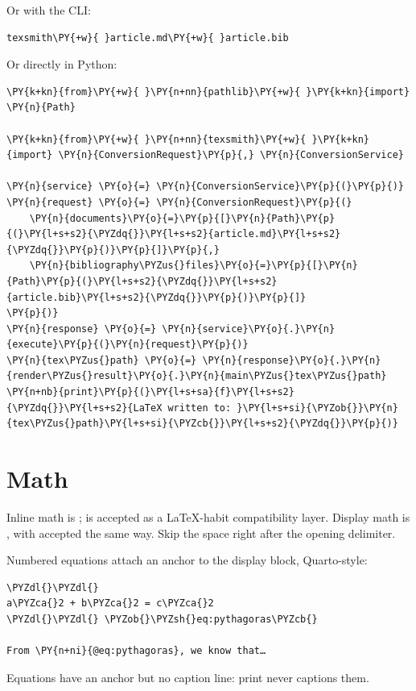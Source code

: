 \documentclass[a4paper,twoside]{article}
\begin{document}
Or with the CLI:
\begin{tscode}[lang=sh, engine=pygments]
\begin{Verbatim}[commandchars=\\\{\},breaklines, breakanywhere, commandchars=\\\{\}]
texsmith\PY{+w}{ }article.md\PY{+w}{ }article.bib
\end{Verbatim}
\end{tscode}
Or directly in Python:
\begin{tscode}[lang=python, engine=pygments]
\begin{Verbatim}[commandchars=\\\{\},breaklines, breakanywhere, commandchars=\\\{\}]
\PY{k+kn}{from}\PY{+w}{ }\PY{n+nn}{pathlib}\PY{+w}{ }\PY{k+kn}{import} \PY{n}{Path}

\PY{k+kn}{from}\PY{+w}{ }\PY{n+nn}{texsmith}\PY{+w}{ }\PY{k+kn}{import} \PY{n}{ConversionRequest}\PY{p}{,} \PY{n}{ConversionService}

\PY{n}{service} \PY{o}{=} \PY{n}{ConversionService}\PY{p}{(}\PY{p}{)}
\PY{n}{request} \PY{o}{=} \PY{n}{ConversionRequest}\PY{p}{(}
    \PY{n}{documents}\PY{o}{=}\PY{p}{[}\PY{n}{Path}\PY{p}{(}\PY{l+s+s2}{\PYZdq{}}\PY{l+s+s2}{article.md}\PY{l+s+s2}{\PYZdq{}}\PY{p}{)}\PY{p}{]}\PY{p}{,}
    \PY{n}{bibliography\PYZus{}files}\PY{o}{=}\PY{p}{[}\PY{n}{Path}\PY{p}{(}\PY{l+s+s2}{\PYZdq{}}\PY{l+s+s2}{article.bib}\PY{l+s+s2}{\PYZdq{}}\PY{p}{)}\PY{p}{]}
\PY{p}{)}
\PY{n}{response} \PY{o}{=} \PY{n}{service}\PY{o}{.}\PY{n}{execute}\PY{p}{(}\PY{n}{request}\PY{p}{)}
\PY{n}{tex\PYZus{}path} \PY{o}{=} \PY{n}{response}\PY{o}{.}\PY{n}{render\PYZus{}result}\PY{o}{.}\PY{n}{main\PYZus{}tex\PYZus{}path}
\PY{n+nb}{print}\PY{p}{(}\PY{l+s+sa}{f}\PY{l+s+s2}{\PYZdq{}}\PY{l+s+s2}{LaTeX written to: }\PY{l+s+si}{\PYZob{}}\PY{n}{tex\PYZus{}path}\PY{l+s+si}{\PYZcb{}}\PY{l+s+s2}{\PYZdq{}}\PY{p}{)}
\end{Verbatim}
\end{tscode}
\section{Math}
Inline math is ;  is accepted as a \LaTeX{}-habit compatibility layer.
Display math is , with \tscodeinline{\textbackslash{}[…\textbackslash{}]} accepted the same way. Skip the space
right after the opening delimiter.

Numbered equations attach an anchor to the display block, Quarto-style:
\begin{tscode}[lang=md, engine=pygments]
\begin{Verbatim}[commandchars=\\\{\},breaklines, breakanywhere, commandchars=\\\{\}]
\PYZdl{}\PYZdl{}
a\PYZca{}2 + b\PYZca{}2 = c\PYZca{}2
\PYZdl{}\PYZdl{} \PYZob{}\PYZsh{}eq:pythagoras\PYZcb{}

From \PY{n+ni}{@eq:pythagoras}, we know that…
\end{Verbatim}
\end{tscode}
Equations have an anchor but no caption line: print never captions them.
\end{document}
